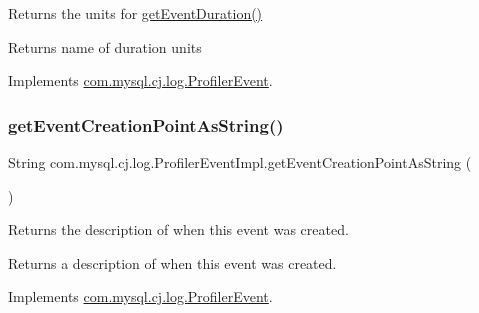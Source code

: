 Returns the units for \mbox{\hyperlink{classcom_1_1mysql_1_1cj_1_1log_1_1_profiler_event_impl_a52efd224f93dd9a3238995df02e4f330}{get\+Event\+Duration()}}

\begin{DoxyReturn}{Returns}
name of duration units 
\end{DoxyReturn}


Implements \mbox{\hyperlink{interfacecom_1_1mysql_1_1cj_1_1log_1_1_profiler_event_aabb8272339aac8d5fd4985da51c93cd9}{com.\+mysql.\+cj.\+log.\+Profiler\+Event}}.

\mbox{\label{classcom_1_1mysql_1_1cj_1_1log_1_1_profiler_event_impl_aadc8269b69fc66e1c421d5a18e834ceb}} 
\subsubsection{\texorpdfstring{get\+Event\+Creation\+Point\+As\+String()}{getEventCreationPointAsString()}}
{\footnotesize\ttfamily String com.\+mysql.\+cj.\+log.\+Profiler\+Event\+Impl.\+get\+Event\+Creation\+Point\+As\+String (\begin{DoxyParamCaption}{ }\end{DoxyParamCaption})}

Returns the description of when this event was created.

\begin{DoxyReturn}{Returns}
a description of when this event was created. 
\end{DoxyReturn}


Implements \mbox{\hyperlink{interfacecom_1_1mysql_1_1cj_1_1log_1_1_profiler_event_a839ab93561623274644822815bbaf71f}{com.\+mysql.\+cj.\+log.\+Profiler\+Event}}.

\mbox{\label{classcom_1_1mysql_1_1cj_1_1log_1_1_profiler_event_impl_a813e48b37bcb0b9c5169a262801f4d00}} 
